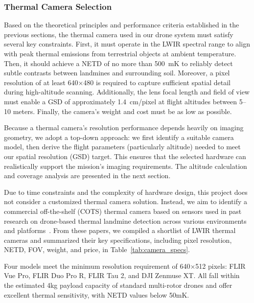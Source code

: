 \subsubsection{Thermal Camera Selection}\label{thermal_selection}

Based on the theoretical principles and performance criteria established in the previous sections, the thermal camera used in our drone system must satisfy several key constraints. First, it must operate in the LWIR spectral range to align with peak thermal emissions from terrestrial objects at ambient temperature. Then, it should achieve a NETD of no more than 500~mK to reliably detect subtle contrasts between landmines and surrounding soil. Moreover, a pixel resolution of at least 640×480 is required to capture sufficient spatial detail during high-altitude scanning. Additionally, the lens focal length and field of view must enable a GSD of approximately 1.4~cm/pixel at flight altitudes between 5–10 meters. Finally, the camera’s weight and cost must be as low as possible.

Because a thermal camera’s resolution performance depends heavily on imaging geometry, we adopt a top-down approach: we first identify a suitable camera model, then derive the flight parameters (particularly altitude) needed to meet our spatial resolution (GSD) target. This ensures that the selected hardware can realistically support the mission’s imaging requirements. The altitude calculation and coverage analysis are presented in the next section.

Due to time constraints and the complexity of hardware design, this project does not consider a customized thermal camera solution. Instead, we aim to identify a commercial off-the-shelf (COTS) thermal camera based on sensors used in past research on drone-based thermal landmine detection across various environments and platforms~\cite{baur2020applying,nikulin2018detection,krause2018diurnal,TENORIOTAMAYO2024105567,FORERORAMIREZ2022104307,rs15040967,dena2020image,Fardoulis2020PROOFHS,butt2024uav,AgrawalChung2024ComparingSL,Popov2022MethodFM,TENORIOTAMAYO2023109443}. From these papers, we compiled a shortlist of LWIR thermal cameras and summarized their key specifications, including pixel resolution, NETD, FOV, weight, and price, in Table~\ref{tab:camera_specs}.

Four models meet the minimum resolution requirement of 640×512 pixels: FLIR Vue Pro, FLIR Duo Pro R, FLIR Tau 2, and DJI Zenmuse XT. All fall within the estimated 4kg payload capacity of standard multi-rotor drones and offer excellent thermal sensitivity, with NETD values below 50mK.

